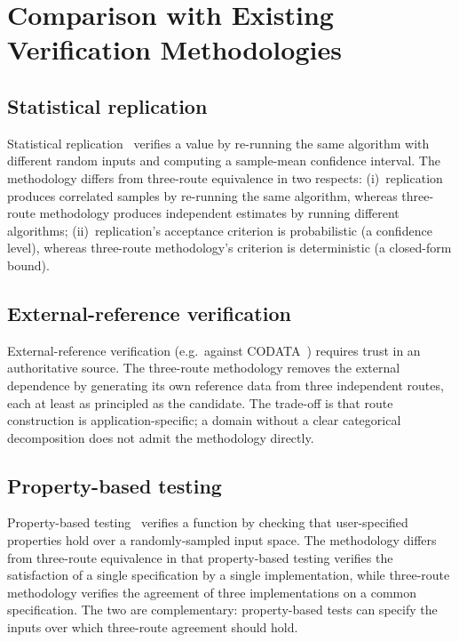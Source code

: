 \documentclass[twocolumn,11pt,a4paper]{article}
\begin{document}
\section{Comparison with Existing Verification Methodologies}
\label{sec:related}

\subsection{Statistical replication}

Statistical replication~\citep{jaynes2003probability,bevington2003data} verifies a value by re-running the same algorithm with different random inputs and computing a sample-mean confidence interval. The methodology differs from three-route equivalence in two respects: (i)~replication produces correlated samples by re-running the same algorithm, whereas three-route methodology produces independent estimates by running different algorithms; (ii)~replication's acceptance criterion is probabilistic (a confidence level), whereas three-route methodology's criterion is deterministic (a closed-form bound).

\subsection{External-reference verification}

External-reference verification (e.g.\ against CODATA~\citealp{codata2018}) requires trust in an authoritative source. The three-route methodology removes the external dependence by generating its own reference data from three independent routes, each at least as principled as the candidate. The trade-off is that route construction is application-specific; a domain without a clear categorical decomposition does not admit the methodology directly.

\subsection{Property-based testing}

Property-based testing~\citep{claessen2000quickcheck} verifies a function by checking that user-specified properties hold over a randomly-sampled input space. The methodology differs from three-route equivalence in that property-based testing verifies the satisfaction of a single specification by a single implementation, while three-route methodology verifies the agreement of three implementations on a common specification. The two are complementary: property-based tests can specify the inputs over which three-route agreement should hold.
\end{document}
